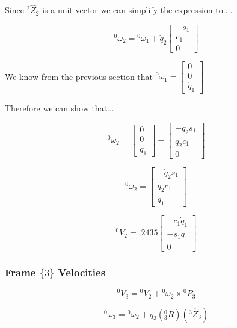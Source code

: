 \noindent Since ${}^{2}\hat{Z}_2$ is a unit vector we can simplify the expression to....

$$
{}^{0}\omega_2 = {}^{0}\omega_{1} + \dot{q}_{2} \left[\begin{array}{c} -s_{1} \\ c_{1} \\ 0
\end{array}\right]
$$


\noindent We know from the previous section that ${}^{0}\omega_1 = \left[\begin{array}{c} 0 \\  0 \\ \dot{q}_{1} \end{array}\right]$


\noindent Therefore we can show that...



$$
{}^{0}\omega_2 = \left[\begin{array}{c} 0 \\  0 \\ \dot{q}_{1} \end{array}\right]+ \left[\begin{array}{c} -\dot{q}_{2}s_{1} \\ \dot{q}_{2}c_{1} \\ 0
\end{array}\right]
$$

$$
{}^{0}\omega_2 = \left[\begin{array}{c} -\dot{q}_{2}s_{1} \\ \dot{q}_{2}c_{1} \\ \dot{q}_{1}
\end{array}\right]
$$

$$
{}^{0}V_{2} = .2435 \begin{bmatrix} -c_1\dot{q}_1 \\ -s_1\dot{q}_1 \\ 0\end{bmatrix}
$$





\subsubsection*{Frame $\{ 3 \}$ Velocities}


$$
{}^{0}V_{3} = {}^{0}V_{2} + {}^{0}\omega_{2} \times {}^{0}P_{3}
$$

$$
{}^{0}\omega_3 = {}^{0}\omega_{2} + \dot{q}_{3} \left( {}^{0}_{3}R \right) \left( {}^{3}\hat{Z}_{3}\right)
$$

